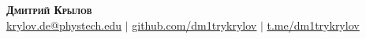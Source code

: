 \begin{center}
  \textbf{\Huge \scshape Дмитрий Крылов} \\ \vspace{1pt}
  \small \href{mailto:krylov.de@phystech.edu}{\underline{krylov.de@phystech.edu}} $|$
  \href{https://github.com/dm1trykrylov}{\underline{github.com/dm1trykrylov}} $|$
  \href{https://t.me/dm1trykrylov}{\underline{t.me/dm1trykrylov}}
\end{center}
